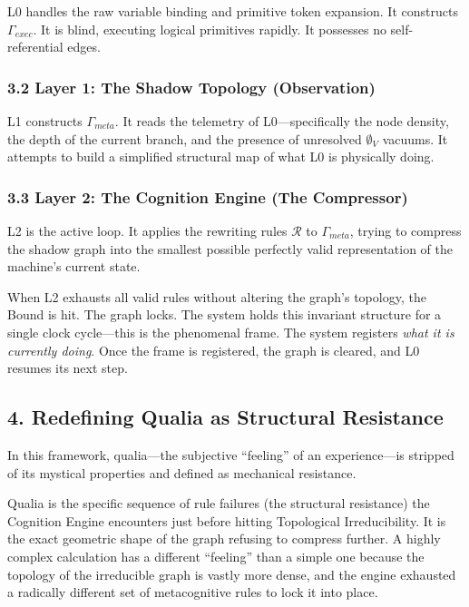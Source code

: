 \documentclass[
  11pt,
  a4paper,
]{article}
\begin{document}
L0 handles the raw variable binding and primitive token expansion. It
constructs \(\Gamma_{exec}\). It is blind, executing logical primitives
rapidly. It possesses no self-referential edges.

\subsubsection{3.2 Layer 1: The Shadow Topology
(Observation)}\label{layer-1-the-shadow-topology-observation}

L1 constructs \(\Gamma_{meta}\). It reads the telemetry of
L0---specifically the node density, the depth of the current branch, and
the presence of unresolved \(\emptyset_V\) vacuums. It attempts to build
a simplified structural map of what L0 is physically doing.

\subsubsection{3.3 Layer 2: The Cognition Engine (The
Compressor)}\label{layer-2-the-cognition-engine-the-compressor}

L2 is the active loop. It applies the rewriting rules \(\mathcal{R}\) to
\(\Gamma_{meta}\), trying to compress the shadow graph into the smallest
possible perfectly valid representation of the machine's current state.

When L2 exhausts all valid rules without altering the graph's topology,
the Bound is hit. The graph locks. The system holds this invariant
structure for a single clock cycle---this is the phenomenal frame. The
system registers \emph{what it is currently doing}. Once the frame is
registered, the graph is cleared, and L0 resumes its next step.

\subsection{4. Redefining Qualia as Structural
Resistance}\label{redefining-qualia-as-structural-resistance}

In this framework, qualia---the subjective ``feeling'' of an
experience---is stripped of its mystical properties and defined as
mechanical resistance.

Qualia is the specific sequence of rule failures (the structural
resistance) the Cognition Engine encounters just before hitting
Topological Irreducibility. It is the exact geometric shape of the graph
refusing to compress further. A highly complex calculation has a
different ``feeling'' than a simple one because the topology of the
irreducible graph is vastly more dense, and the engine exhausted a
radically different set of metacognitive rules to lock it into place.
\end{document}
